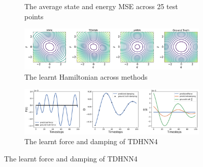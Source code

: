 \documentclass[twoside]{article}
\begin{document}
\begin{figure}[!htb]
\begin{subfigure}[b]{0.48\textwidth}
\caption{The average state and energy MSE across 25 test points}
\end{subfigure}
\begin{subfigure}[b]{0.48\textwidth}
\includegraphics[width=\textwidth]{figures/figures/damped/1/damped_hamiltonian_0.pdf}
\caption{The learnt Hamiltonian across methods}
\end{subfigure}
\begin{subfigure}[b]{0.48\textwidth}
\includegraphics[width=\textwidth]{figures/figures/damped/1/damped_dpdt_0.pdf}
\caption{The learnt force and damping of TDHNN4}
\end{subfigure}
\label{mspring_full}
\end{figure}
\end{document}
